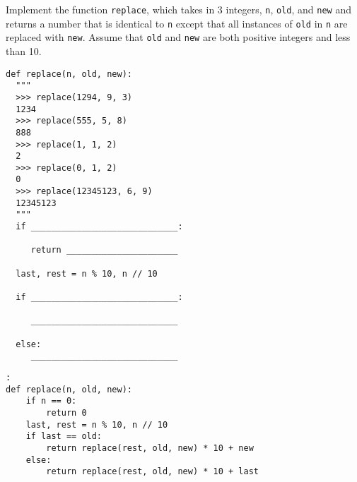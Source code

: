 \begin{blocksection}
\question Implement the function \texttt{replace}, which takes in 3 integers, \texttt{n}, \texttt{old}, and \texttt{new} and returns a number that is identical to \texttt{n} except that all instances of \texttt{old} in \texttt{n} are replaced with \texttt{new}. Assume that \texttt{old} and \texttt{new} are both positive integers and less than 10.

\begin{lstlisting}
def replace(n, old, new): 
  """ 
  >>> replace(1294, 9, 3)
  1234
  >>> replace(555, 5, 8)
  888
  >>> replace(1, 1, 2)
  2
  >>> replace(0, 1, 2)
  0
  >>> replace(12345123, 6, 9)
  12345123
  """
  if _____________________________:
  
     return ______________________
     
  last, rest = n % 10, n // 10
  
  if _____________________________:
  
     _____________________________
	 
  else:
     _____________________________
\end{lstlisting}
\end{blocksection}
\begin{blocksection}

\begin{solution}[.25in]
\begin{lstlisting}:
def replace(n, old, new): 
    if n == 0:
        return 0		
    last, rest = n % 10, n // 10
    if last == old:
        return replace(rest, old, new) * 10 + new	
    else:
        return replace(rest, old, new) * 10 + last
\end{lstlisting}
\end{solution}
\end{blocksection}
